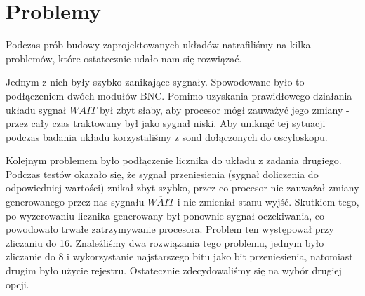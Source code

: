 \documentclass[fleqn]{article}
\begin{document}
\section{Problemy}

Podczas prób budowy zaprojektowanych układów natrafiliśmy na kilka problemów, które ostatecznie udało nam się rozwiązać.

Jednym z nich były szybko zanikające sygnały. Spowodowane było to podłączeniem dwóch modułów BNC. Pomimo uzyskania prawidłowego działania układu sygnał $\overline{WAIT}$ był zbyt słaby, aby procesor mógł zauważyć jego zmiany - przez cały czas traktowany był jako sygnał niski. Aby uniknąć tej sytuacji podczas badania układu korzystaliśmy z sond dołączonych do oscyloskopu.

Kolejnym problemem było podłączenie licznika do układu z zadania drugiego. Podczas testów okazało się, że sygnał przeniesienia (sygnał doliczenia do odpowiedniej wartości) znikał zbyt szybko, przez co procesor nie zauważał zmiany generowanego przez nas sygnału $\overline{WAIT}$ i nie zmieniał stanu wyjść. Skutkiem tego, po wyzerowaniu licznika generowany był ponownie sygnał oczekiwania, co powodowało trwałe zatrzymywanie procesora. Problem ten występował przy zliczaniu do 16. Znaleźliśmy dwa rozwiązania tego problemu, jednym było zliczanie do 8 i wykorzystanie najstarszego bitu jako bit przeniesienia, natomiast drugim było użycie rejestru. Ostatecznie zdecydowaliśmy się na wybór drugiej opcji.
\end{document}
